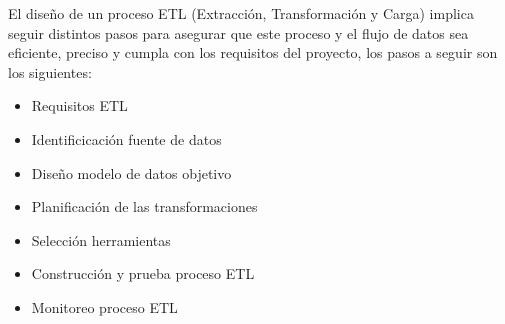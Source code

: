 El diseño de un proceso ETL (Extracción, Transformación y Carga) implica seguir distintos pasos para asegurar que este proceso y el flujo de datos sea eficiente, preciso y cumpla con los requisitos del proyecto, los pasos a seguir son los siguientes:
\begin{itemize}
    \item Requisitos ETL
    \item Identificicación fuente de datos
    \item Diseño modelo de datos objetivo
    \item Planificación de las transformaciones
    \item Selección herramientas
    \item Construcción y prueba proceso ETL
    \item Monitoreo proceso ETL
\end{itemize}

